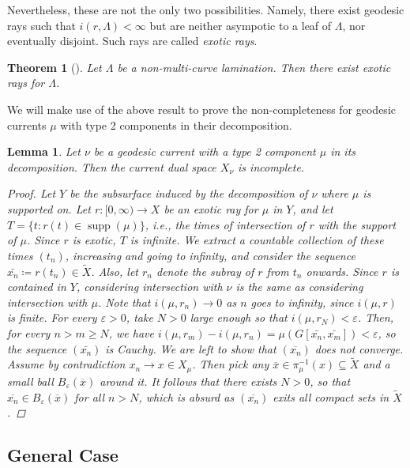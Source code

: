 \documentclass[12pt,article]{amsart}
\numberwithin{equation}{section}
\numberwithin{figure}{section}
\newtheorem{theorem}[equation]{Theorem}
\newtheorem{lemma}[equation]{Lemma}
\theoremstyle{definition}
\theoremstyle{plain}
\newcommand*{\wt}[1]{\widetilde{#1}}
\renewcommand{\epsilon}{\varepsilon}
\DeclareMathOperator{\supp}{supp}
\begin{document}
Nevertheless, these are not the only two possibilities. Namely, there exist geodesic rays such that $i (r, \Lambda) < \infty$ but are neither asympotic to a leaf of $\Lambda$, nor eventually disjoint. Such rays are called \emph{exotic rays}.

\begin{theorem}[{\cite[Theorem~1.1]{TuZh21:halo}}]
Let $\Lambda$ be a non-multi-curve lamination. Then there exist exotic rays for $\Lambda$.
\end{theorem}

We will make use of the above result to prove the non-completeness for geodesic currents $\mu$ with type 2 components in their decomposition.

\begin{lemma}
Let $\nu$ be a geodesic current with a type 2 component $\mu$ in its decomposition. Then the current dual space $X_{\nu}$ is incomplete.
\begin{proof}
Let $Y$ be the subsurface induced by the decomposition of $\nu$ where $\mu$ is supported on.
Let $r \colon [0, \infty) \to X$ be an exotic ray for $\mu$ in $Y$, and let $T = \{ t \colon r(t) \in \supp(\mu) \}$, i.e., the times of intersection of $r$ with the support of $\mu$. Since $r$ is exotic, $T$ is infinite. We extract a countable collection of these times $(t_n)$, increasing and going to infinity, and consider the sequence $\bar{x_n} \coloneqq r(t_n) \in \wt{X}$. Also, let $r_n$ denote the subray of $r$ from $t_n$ onwards. Since $r$ is contained in $Y$, considering intersection with $\nu$ is the same as considering intersection with $\mu$. Note that $i(\mu, r_n) \to 0$ as $n$ goes to infinity, since $i(\mu, r)$ is finite.
For every $\epsilon>0$, take $N>0$ large enough so that $i(\mu,r_N) < \epsilon$. 
Then, for every $n> m \geq N$, we have $i(\mu,r_m)-i(\mu,r_n) = \mu(G[\bar{x_n},\bar{x_m}]) < \epsilon$, so the sequence $(\bar{x_n})$ is Cauchy. 
We are left to show that $(\overline{x_n})$ does not converge. Assume by contradiction $x_n \to x \in X_\mu$. Then pick any $\overline{x} \in \pi_{\mu}^{-1} (x) \subseteq \wt{X}$ and a small ball $B_\epsilon (\overline{x})$ around it. It follows that there exists $N > 0$, so that $\overline{x_n} \in B_\epsilon (\overline{x}) $ for all $n > N$, which is absurd as $(\overline{x_n})$ exits all compact sets in $\wt{X}$.
\end{proof}
\label{prop:incomplete}
\end{lemma}



\subsection{General Case}
\label{subsec:general}
\end{document}

